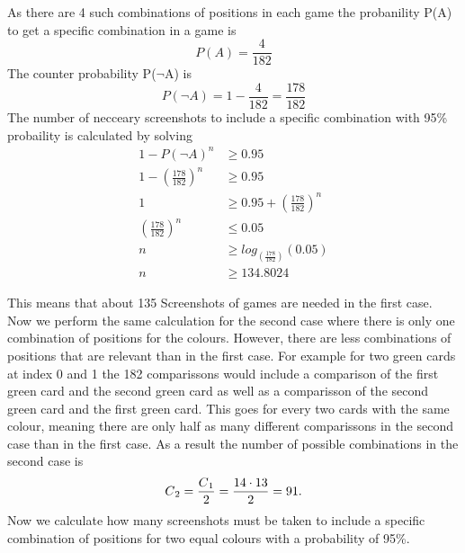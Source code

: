 \begin{center}
	As there are 4 such combinations of positions in each game the probanility P(A) to get a specific combination in a game is 
	\begin{equation*}
		P(A) = \frac{4}{182} %
	\end{equation*}
	The counter probability P($\lnot$A) is 
	\begin{equation*}
		P(\lnot A) = 1 - \frac{4}{182} = \frac{178}{182}%
	\end{equation*}
	The number of necceary screenshots to include a specific combination with 95\% probaility is calculated by solving
	\begin{align*}
		1 - P(\lnot A)^n &\geq 0.95 \\
		1 - \left(\frac{178}{182}\right)^n &\geq 0.95 \\
		1 &\geq 0.95 + \left(\frac{178}{182}\right)^n\\
		\left(\frac{178}{182}\right)^n &\leq 0.05\\
		n &\geq log_{(\frac{178}{182})}(0.05) \\
		n &\geq 134.8024 %
	\end{align*}
\end{center}
This means that about 135 Screenshots of games are needed in the first case. Now we perform the same calculation for the second case where there is only one combination of positions for the colours. However, there are less combinations of positions that are relevant than in the first case. For example for two green cards at index 0 and 1 the 182 comparissons would include a comparison of the first green card and the second green card as well as a comparisson of the second green card and the first green card. This goes for every two cards with the same colour, meaning there are only half as many different comparissons in the second case than in the first case. As a result the number of possible combinations in the second case is
\begin{equation*}
C\textsubscript{2} = \frac{C\textsubscript{1}}{2} = \frac{14 \cdot 13}{2} = 91.
\end{equation*}
Now we calculate how many screenshots must be taken to include a specific combination of positions for two equal colours with a probability of 95\%. 
